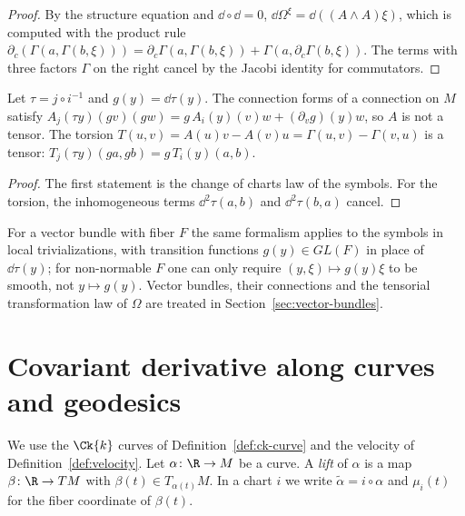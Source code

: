 \begin{proof}
  \leanok
  By the structure equation and $\dd \circ \dd = 0$, $\dd\Omega^\xi = \dd((A \wedge A)\xi)$, which
  is computed with the product rule
  $\partial_c(\Gamma(a, \Gamma(b, \xi))) = \partial_c\Gamma(a, \Gamma(b, \xi)) + \Gamma(a,
  \partial_c\Gamma(b, \xi))$. The terms with three factors $\Gamma$ on the right cancel by the
  Jacobi identity for commutators.
\end{proof}

\begin{proposition}
  \label{prop:gauge}
  \leanok
  Let $\tau = j \circ i^{-1}$ and $g(y) = \dd\tau(y)$. The connection forms of a connection on
  $M$ satisfy $A_j(\tau y)(g v)(g w) = g\,A_i(y)(v) w + (\partial_v g)(y) w$, so $A$ is not a
  tensor. The torsion $T(u, v) = A(u)v - A(v)u = \Gamma(u, v) - \Gamma(v, u)$ is a tensor:
  $T_j(\tau y)(g a, g b) = g\, T_i(y)(a, b)$.
\end{proposition}

\begin{proof}
  \leanok
  The first statement is the change of charts law of the symbols. For the torsion, the
  inhomogeneous terms $\dd^2\tau(a, b)$ and $\dd^2\tau(b, a)$ cancel.
\end{proof}

\begin{remark}
  For a vector bundle with fiber $F$ the same formalism applies to the symbols in local
  trivializations, with transition functions $g(y) \in GL(F)$ in place of $\dd\tau(y)$; for
  non-normable $F$ one can only require $(y, \xi) \mapsto g(y)\xi$ to be smooth, not
  $y \mapsto g(y)$. Vector bundles, their connections and the tensorial transformation law of
  $\Omega$ are treated in Section~\ref{sec:vector-bundles}.
\end{remark}

\section{Covariant derivative along curves and geodesics}

We use the $\Ck{k}$ curves of Definition~\ref{def:ck-curve} and the velocity of
Definition~\ref{def:velocity}. Let $\alpha \colon \R \to M$ be a curve. A \emph{lift} of $\alpha$
is a map $\beta \colon \R \to TM$ with $\beta(t) \in T_{\alpha(t)} M$. In a chart $i$ we write
$\tilde\alpha = i \circ \alpha$ and $\mu_i(t)$ for the fiber coordinate of $\beta(t)$.

